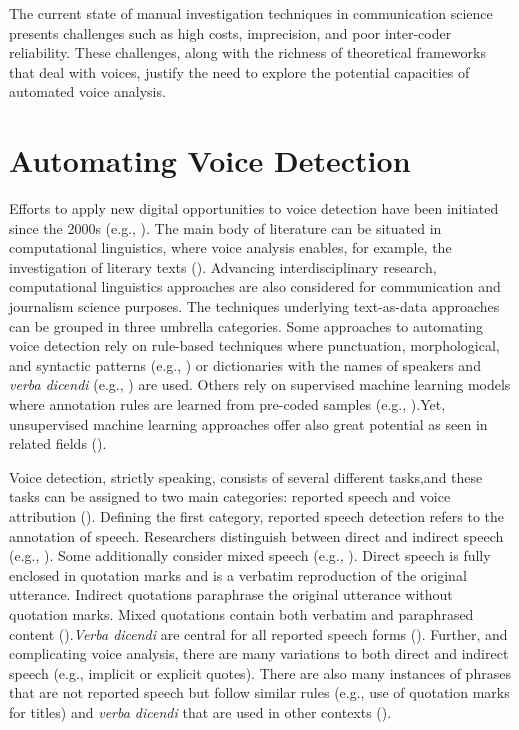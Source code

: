 \documentclass{ccr}
\begin{document}
The current state of manual investigation techniques in communication science presents challenges such as high costs, imprecision, and poor inter-coder reliability. These challenges, along with the richness of theoretical frameworks that deal with voices, justify the need to explore the potential capacities of automated voice analysis.

\section{Automating Voice Detection}Efforts to apply new digital opportunities to voice detection have been initiated since the 2000s (e.g., \cite{pouliquen2007automatic}). The main body of literature can be situated in computational linguistics, where voice analysis enables, for example, the investigation of literary texts (\cite{brunner2015automatische, elson2010automatic, muzny2017two}). Advancing interdisciplinary research, computational linguistics approaches are also considered for communication and journalism science purposes.
The techniques underlying text-as-data approaches can be grouped in three umbrella categories. Some approaches to automating voice detection rely on rule-based techniques where punctuation, morphological, and syntactic patterns (e.g., \cite{krestel2008minding}) or dictionaries with the names of speakers and \textit{verba dicendi} (e.g., \cite{pouliquen2007automatic}) are used. Others rely on supervised machine learning models where annotation rules are learned from pre-coded samples (e.g., \cite{scheible2016model}).Yet, unsupervised machine learning approaches offer also great potential as seen in related fields (\cite{boumans2016taking}).

Voice detection, strictly speaking, consists of several different tasks,and these tasks can be assigned to two main categories: reported speech and voice attribution (\cite{muzny2017two}). Defining the first category, reported speech detection refers to the annotation of speech. Researchers distinguish between direct and indirect speech (e.g., \cite{pouliquen2007automatic, scheible2016model}). Some additionally consider mixed speech (e.g., \cite{pareti2013automatically}). Direct speech is fully enclosed in quotation marks and is a verbatim reproduction of the original utterance. Indirect quotations paraphrase the original utterance without quotation marks. Mixed quotations contain both verbatim and paraphrased content (\cite{pareti2013automatically}).\textit{Verba dicendi} are central for all reported speech forms (\cite{pareti2013automatically, lazaridou2017identifying}). Further, and complicating voice analysis, there are many variations to both direct and indirect speech (e.g., implicit or explicit quotes). There are also many instances of phrases that are not reported speech but follow similar rules (e.g., use of quotation marks for titles) and \textit{verba dicendi} that are used in other contexts (\cite{scheible2016model}).
\end{document}
